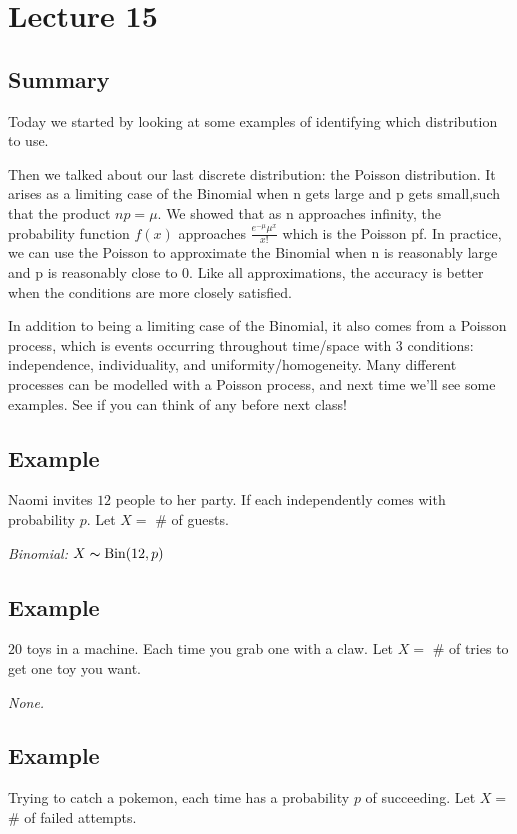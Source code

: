 \section{Lecture 15}
\subsection{Summary}

Today we started by looking at some examples of identifying which distribution to use. 

Then we talked about our last discrete distribution: the Poisson distribution. It arises as a limiting case of the Binomial when n gets large and p gets small,such that the product $np = \mu$. We showed that as n approaches infinity, the probability function $f(x)$ approaches $ \frac{e^{-\mu}\mu^x}{x!} $ which is the Poisson pf. In practice, we can use the Poisson to approximate the Binomial when n is reasonably large and p is reasonably close to 0. Like all approximations, the accuracy is better when the conditions are more closely satisfied.

In addition to being a limiting case of the Binomial, it also comes from a Poisson process, which is events occurring throughout time/space with 3 conditions: independence, individuality, and uniformity/homogeneity. Many different processes can be modelled with a Poisson process, and next time we'll see some examples. See if you can think of any before next class!

\subsection{Example}
Naomi invites $ 12 $ people to her party. If each independently comes with
probability $ p $.
Let $ X= $ \# of guests.

\emph{Binomial:} $ X \thicksim \operatorname{Bin}(12,p) $

\subsection{Example}
$ 20 $ toys in a machine. Each time you grab one with a claw. 
Let $ X= $ \# of tries to get one toy you want.

\emph{None.}

\subsection{Example}
Trying to catch a pokemon, each time has a probability $ p $ of succeeding.
Let $ X= $ \# of failed attempts.


